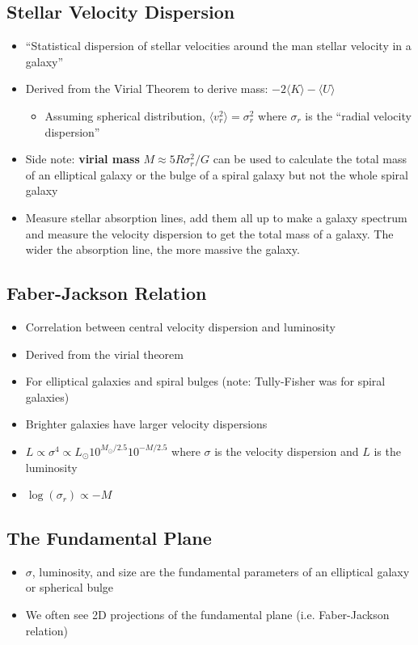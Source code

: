 \documentclass{book}
\begin{document}
\subsection{Stellar Velocity Dispersion}
\begin{itemize}
    \item ``Statistical dispersion of stellar velocities around the man stellar velocity in a galaxy''
    \item Derived from the Virial Theorem to derive mass: $-2\langle K \rangle - \langle U \rangle$
          \begin{itemize}
              \item Assuming spherical distribution, $\langle v_r^2 \rangle = \sigma_r^2$ where $\sigma_r$ is the ``radial velocity dispersion''
          \end{itemize}
    \item Side note: \textbf{virial mass} $M \approx 5 R \sigma_r^2 / G$ can be used to calculate the total mass of an elliptical galaxy or the bulge of a spiral galaxy but not the whole spiral galaxy
    \item Measure stellar absorption lines, add them all up to make a galaxy spectrum and measure the velocity dispersion to get the total mass of a galaxy. The wider the absorption line, the more massive the galaxy.
\end{itemize}
\subsection{Faber-Jackson Relation}
\begin{itemize}
    \item Correlation between central velocity dispersion and luminosity
    \item Derived from the virial theorem
    \item For elliptical galaxies and spiral bulges (note: Tully-Fisher was for spiral galaxies)
    \item Brighter galaxies have larger velocity dispersions
    \item $L \propto \sigma^4 \propto L_\odot 10^{M_\odot/2.5}10^{-M/2.5}$ where $\sigma$ is the velocity dispersion and $L$ is the luminosity
    \item $\log (\sigma_r) \propto - M$
\end{itemize}
\subsection{The Fundamental Plane}
\begin{itemize}
    \item $\sigma$, luminosity, and size are the fundamental parameters of an elliptical galaxy or spherical bulge
    \item We often see 2D projections of the fundamental plane (i.e. Faber-Jackson relation)
\end{itemize}
\end{document}
